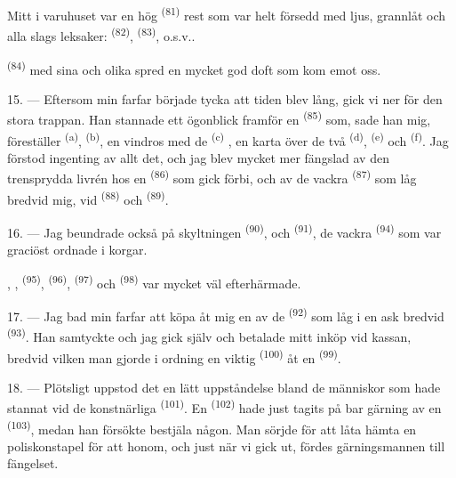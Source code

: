 Mitt i varuhuset var en hög  \textsuperscript{(81)} rest som var helt försedd
med ljus, grannlåt och alla slags leksaker:  \textsuperscript{(82)},
 \textsuperscript{(83)}, o.s.v..

 \textsuperscript{(84)} med sina  och
olika  spred en mycket god doft som kom emot oss.

\VUsaut{3.4mm}
\VUsaut{2.8mm}

15. --- Eftersom min farfar började tycka att tiden blev lång, gick vi ner för den stora
trappan. Han stannade ett ögonblick framför en 
\textsuperscript{(85)} som, sade han mig, föreställer  \textsuperscript{(a)},
 \textsuperscript{(b)}, en vindros med de
 \textsuperscript{(c)}
, en karta över de två
 \textsuperscript{(d)}, 
\textsuperscript{(e)} och  \textsuperscript{(f)}. Jag förstod ingenting av
allt det, och jag blev mycket mer fängslad av den trensprydda livrén hos en
 \textsuperscript{(86)} som gick förbi, och av de vackra
 \textsuperscript{(87)} som låg bredvid mig, vid 
\textsuperscript{(88)} och
 \textsuperscript{(89)}.

16. --- Jag beundrade också på skyltningen  \textsuperscript{(90)}, och
 \textsuperscript{(91)}, de vackra 
\textsuperscript{(94)} som var graciöst ordnade i korgar.

, , 
\textsuperscript{(95)},  \textsuperscript{(96)},
 \textsuperscript{(97)} och 
\textsuperscript{(98)} var mycket väl efterhärmade.

\VUsaut{4.4mm}
\VUsaut{2.8mm}

17. --- Jag bad min farfar att köpa åt mig en av de 
\textsuperscript{(92)} som låg i en ask bredvid  \textsuperscript{(93)}. Han
samtyckte och jag gick själv och betalade mitt inköp vid kassan, bredvid vilken man gjorde i
ordning en viktig  \textsuperscript{(100)} åt en 
\textsuperscript{(99)}.

18. --- Plötsligt uppstod det en lätt uppståndelse bland de människor som hade stannat vid de
konstnärliga  \textsuperscript{(101)}. En
 \textsuperscript{(102)} hade just tagits på bar gärning av en
 \textsuperscript{(103)}, medan han försökte bestjäla någon.
Man sörjde för att låta hämta en poliskonstapel för att  honom, och just när vi
gick ut, fördes gärningsmannen till fängelset.

\VUsaut{6.0mm}
\VUfilet{22mm}
